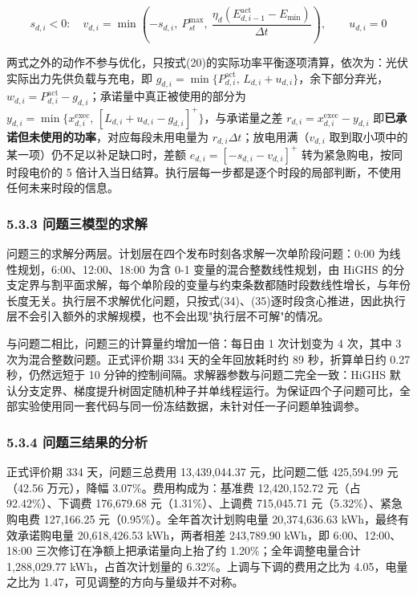 \documentclass[12pt,a4paper]{ctexart}
\begin{document}
\begin{equation}
s_{d,i}<0:\quad v_{d,i}=\min\left(-s_{d,i},\ P_{st}^{\max},\ \frac{\eta_d\left(E_{d,i-1}^{\mathrm{act}}-E_{\min}\right)}{\Delta t}\right),\qquad u_{d,i}=0
\end{equation}

两式之外的动作不参与优化，只按式(20)的实际功率平衡逐项清算，依次为：光伏实际出力先供负载与充电，即 $g_{d,i}=\min\{P_{d,i}^{\mathrm{act}},\,L_{d,i}+u_{d,i}\}$，余下部分弃光，$w_{d,i}=P_{d,i}^{\mathrm{act}}-g_{d,i}$；承诺量中真正被使用的部分为 $y_{d,i}=\min\{x_{d,i}^{\mathrm{exec}},\,[L_{d,i}+u_{d,i}-g_{d,i}]^{+}\}$，与承诺量之差 $r_{d,i}=x_{d,i}^{\mathrm{exec}}-y_{d,i}$ 即\textbf{已承诺但未使用的功率}，对应每段未用电量为 $r_{d,i}\Delta t$；放电用满（$v_{d,i}$ 取到取小项中的某一项）仍不足以补足缺口时，差额 $e_{d,i}=[-s_{d,i}-v_{d,i}]^{+}$ 转为紧急购电，按同时段电价的 5 倍计入当日结算。执行层每一步都是逐个时段的局部判断，不使用任何未来时段的信息。

\subsubsection*{5.3.3 问题三模型的求解}

问题三的求解分两层。计划层在四个发布时刻各求解一次单阶段问题：0:00 为线性规划，6:00、12:00、18:00 为含 0-1 变量的混合整数线性规划，由 HiGHS 的分支定界与割平面求解，每个单阶段的变量与约束条数都随时段数线性增长，与年份长度无关。执行层不求解优化问题，只按式(34)、(35)逐时段贪心推进，因此执行层不会引入额外的求解规模，也不会出现"执行层不可解"的情况。

与问题二相比，问题三的计算量约增加一倍：每日由 1 次计划变为 4 次，其中 3 次为混合整数问题。正式评价期 334 天的全年回放耗时约 89 秒，折算单日约 0.27 秒，仍然远短于 10 分钟的控制间隔。求解器参数与问题二完全一致：HiGHS 默认分支定界、梯度提升树固定随机种子并单线程运行。为保证四个子问题可比，全部实验使用同一套代码与同一份冻结数据，未针对任一子问题单独调参。

\subsubsection*{5.3.4 问题三结果的分析}

正式评价期 334 天，问题三总费用 13,439,044.37 元，比问题二低 425,594.99 元（42.56 万元），降幅 3.07\%。费用构成为：基准费 12,420,152.72 元（占 92.42\%）、下调费 176,679.68 元（1.31\%）、上调费 715,045.71 元（5.32\%）、紧急购电费 127,166.25 元（0.95\%）。全年首次计划购电量 20,374,636.63 kWh，最终有效承诺购电量 20,618,426.53 kWh，两者相差 243,789.90 kWh，即 6:00、12:00、18:00 三次修订在净额上把承诺量向上抬了约 1.20\%；全年调整电量合计 1,288,029.77 kWh，占首次计划量的 6.32\%。上调与下调的费用之比为 4.05，电量之比为 1.47，可见调整的方向与量级并不对称。
\end{document}
